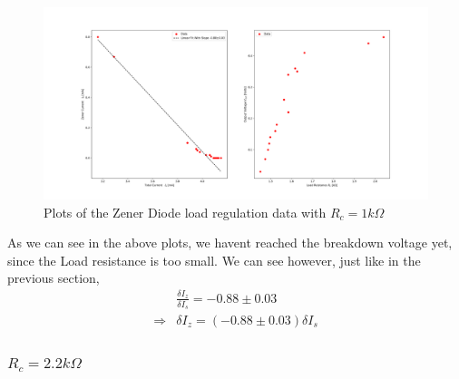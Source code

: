 \documentclass[10pt]{scrartcl}
\theoremstyle{definition}
\begin{document}
\begin{figure}[h]
    \centering
    \includegraphics[width=\linewidth]{withoutrc.png}
    \caption{Plots of the Zener Diode load regulation data with $R_c = 1 k\Omega$}
\end{figure}
As we can see in the above plots, we havent reached the breakdown voltage yet, since the Load resistance
is too small. We can see however, just like in the previous section, 
\begin{align*}
    &\frac{\delta{I_z}}{\delta{I_s}} = -0.88 \pm 0.03 \\ 
    \Rightarrow &\boxed{\delta{I_z} = (-0.88 \pm 0.03)\delta{I_s}}
\end{align*}
\subsubsection*{$R_c = 2.2 k\Omega$}
\end{document}
